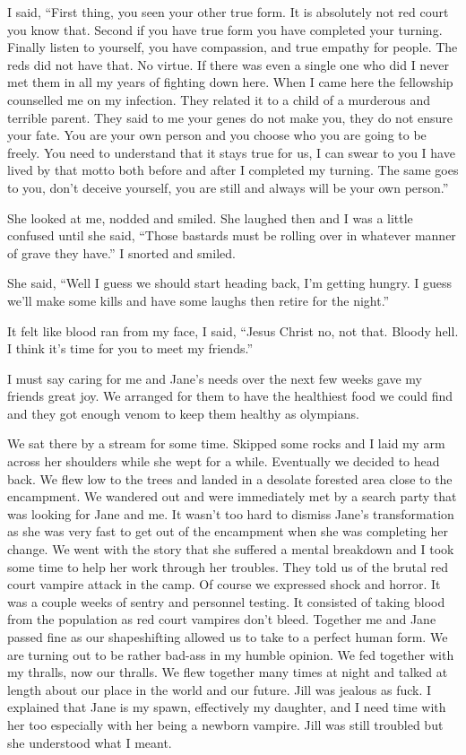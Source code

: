 I said, ``First thing, you seen your other true form. It is absolutely not red court you know that. Second if you have true form you have completed your turning. Finally listen to yourself, you have compassion, and true empathy for people. The reds did not have that. No virtue. If there was even a single one who did I never met them in all my years of fighting down here. When I came here the fellowship counselled me on my infection. They related it to a child of a murderous and terrible parent. They said to me your genes do not make you, they do not ensure your fate. You are your own person and you choose who you are going to be freely. You need to understand that it stays true for us, I can swear to you I have lived by that motto both before and after I completed my turning. The same goes to you, don't deceive yourself, you are still and always will be your own person.''

She looked at me, nodded and smiled. She laughed then and I was a little confused until she said, ``Those bastards must be rolling over in whatever manner of grave they have.'' I snorted and smiled.

She said, ``Well I guess we should start heading back, I'm getting hungry. I guess we'll make some kills and have some laughs then retire for the night.''

It felt like blood ran from my face, I said, ``Jesus Christ no, not that. Bloody hell. I think it's time for you to meet my friends.''

I must say caring for me and Jane's needs over the next few weeks gave my friends great joy. We arranged for them to have the healthiest food we could find and they got enough venom to keep them healthy as olympians.

\parasep

We sat there by a stream for some time. Skipped some rocks and I laid my arm across her shoulders while she wept for a while. Eventually we decided to head back. We flew low to the trees and landed in a desolate forested area close to the encampment. We wandered out and were immediately met by a search party that was looking for Jane and me. It wasn't too hard to dismiss Jane's transformation as she was very fast to get out of the encampment when she was completing her change. We went with the story that she suffered a mental breakdown and I took some time to help her work through her troubles. They told us of the brutal red court vampire attack in the camp. Of course we expressed shock and horror. It was a couple weeks of sentry and personnel testing. It consisted of taking blood from the population as red court vampires don't bleed. Together me and Jane passed fine as our shapeshifting allowed us to take to a perfect human form. We are turning out to be rather bad-ass in my humble opinion. We fed together with my thralls, now our thralls. We flew together many times at night and talked at length about our place in the world and our future. Jill was jealous as fuck. I explained that Jane is my spawn, effectively my daughter, and I need time with her too especially with her being a newborn vampire. Jill was still troubled but she understood what I meant.

